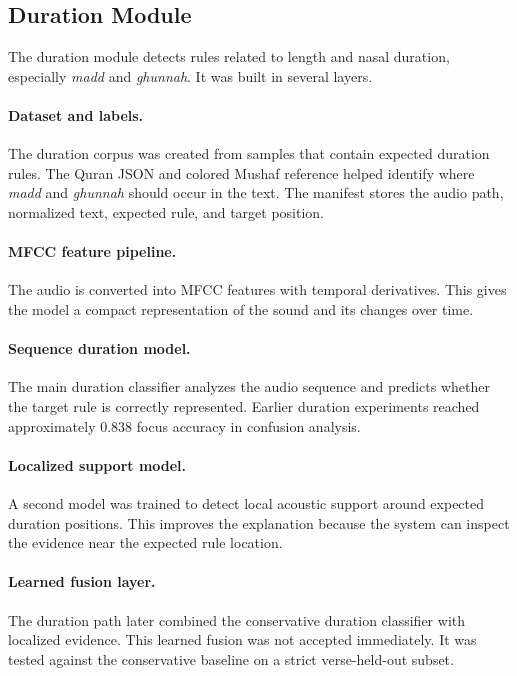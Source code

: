\documentclass[12pt,a4paper]{report}
\begin{document}
\subsection{Duration Module}

The duration module detects rules related to length and nasal duration,
especially \textit{madd} and \textit{ghunnah}. It was built in several layers.

\paragraph{Dataset and labels.}
The duration corpus was created from samples that contain expected duration
rules. The Quran JSON and colored Mushaf reference helped identify where
\textit{madd} and \textit{ghunnah} should occur in the text. The manifest stores
the audio path, normalized text, expected rule, and target position.

\paragraph{MFCC feature pipeline.}
The audio is converted into MFCC features with temporal derivatives. This gives
the model a compact representation of the sound and its changes over time.

\paragraph{Sequence duration model.}
The main duration classifier analyzes the audio sequence and predicts whether
the target rule is correctly represented. Earlier duration experiments reached
approximately 0.838 focus accuracy in confusion analysis.

\paragraph{Localized support model.}
A second model was trained to detect local acoustic support around expected
duration positions. This improves the explanation because the system can inspect
the evidence near the expected rule location.

\paragraph{Learned fusion layer.}
The duration path later combined the conservative duration classifier with
localized evidence. This learned fusion was not accepted immediately. It was
tested against the conservative baseline on a strict verse-held-out subset.
\end{document}
